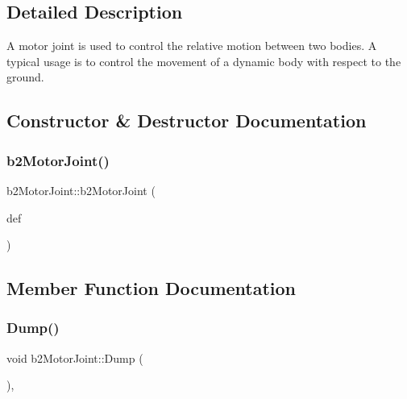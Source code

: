 \subsection{Detailed Description}
A motor joint is used to control the relative motion between two bodies. A typical usage is to control the movement of a dynamic body with respect to the ground. 

\subsection{Constructor \& Destructor Documentation}
\mbox{\label{classb2_motor_joint_ac0c56b069910915e1ceef3b89c035833}} 
\subsubsection{\texorpdfstring{b2MotorJoint()}{b2MotorJoint()}}
{\footnotesize\ttfamily b2\+Motor\+Joint\+::b2\+Motor\+Joint (\begin{DoxyParamCaption}\item[{const \mbox{\hyperlink{structb2_motor_joint_def}{b2\+Motor\+Joint\+Def}} $\ast$}]{def }\end{DoxyParamCaption})\hspace{0.3cm}{\ttfamily [protected]}}



\subsection{Member Function Documentation}
\mbox{\label{classb2_motor_joint_abb67754f39b4747ae07af5cb5b348836}} 
\subsubsection{\texorpdfstring{Dump()}{Dump()}}
{\footnotesize\ttfamily void b2\+Motor\+Joint\+::\+Dump (\begin{DoxyParamCaption}{ }\end{DoxyParamCaption})\hspace{0.3cm}{\ttfamily [override]}, {\ttfamily [virtual]}}



